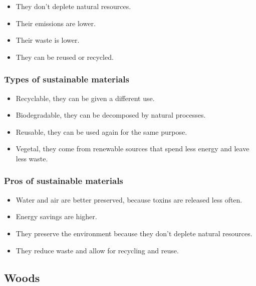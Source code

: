 \documentclass[12pt]{article}
\begin{document}
\begin{itemize}
    \item They don't deplete natural resources.
    \item Their emissions are lower.
    \item Their waste is lower.
    \item They can be reused or recycled.
\end{itemize}

\subsubsection*{Types of sustainable materials}

\begin{itemize}
    \item Recyclable, they can be given a different use.
    \item Biodegradable, they can be decomposed by natural processes.
    \item Reusable, they can be used again for the same purpose.
    \item Vegetal, they come from renewable sources that spend less energy and
    leave less waste.
\end{itemize}

\subsubsection*{Pros of sustainable materials}

\begin{itemize}
    \item Water and air are better preserved, because toxins are released less
    often.
    \item Energy savings are higher.
    \item They preserve the environment because they don't deplete natural
    resources.
    \item They reduce waste and allow for recycling and reuse.
\end{itemize}

\subsection*{Woods}
\end{document}
